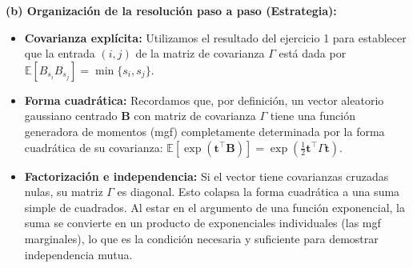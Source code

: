 \documentclass[11pt, letterpaper]{article}
\begin{document}
\vspace{5mm}

\begin{solucion}
    \textbf{(b) Organización de la resolución paso a paso (Estrategia):}
    \begin{itemize}
        \item[(i)] \textbf{Covarianza explícita:} Utilizamos el resultado del ejercicio 1 para establecer que la entrada $(i,j)$ de la matriz de covarianza $\Gamma$ está dada por $\mathbb{E}[B_{s_i} B_{s_j}] = \min\{s_i, s_j\}$.
        \item[(ii)] \textbf{Forma cuadrática:} Recordamos que, por definición, un vector aleatorio gaussiano centrado $\mathbf{B}$ con matriz de covarianza $\Gamma$ tiene una función generadora de momentos (mgf) completamente determinada por la forma cuadrática de su covarianza: $\mathbb{E}[\exp(\mathbf{t}^\top \mathbf{B})] = \exp(\frac{1}{2} \mathbf{t}^\top \Gamma \mathbf{t})$.
        \item[(iii)] \textbf{Factorización e independencia:} Si el vector tiene covarianzas cruzadas nulas, su matriz $\Gamma$ es diagonal. Esto colapsa la forma cuadrática a una suma simple de cuadrados. Al estar en el argumento de una función exponencial, la suma se convierte en un producto de exponenciales individuales (las mgf marginales), lo que es la condición necesaria y suficiente para demostrar independencia mutua.
    \end{itemize}


\end{solucion}
\end{document}
